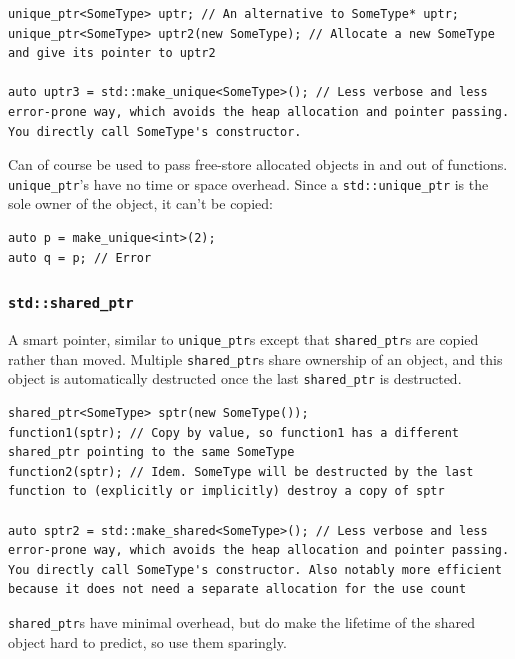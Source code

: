 \documentclass[table, xcdraw]{article}%
\begin{document}
\begin{verbatim}
unique_ptr<SomeType> uptr; // An alternative to SomeType* uptr;
unique_ptr<SomeType> uptr2(new SomeType); // Allocate a new SomeType and give its pointer to uptr2

auto uptr3 = std::make_unique<SomeType>(); // Less verbose and less error-prone way, which avoids the heap allocation and pointer passing. You directly call SomeType's constructor.
\end{verbatim}

Can of course be used to pass free-store allocated objects in and out of functions. \texttt{unique_ptr}'s have no time or space overhead. Since a \texttt{std::unique_ptr} is the sole owner of the object, it can't be copied:

\begin{verbatim}
auto p = make_unique<int>(2);
auto q = p; // Error
\end{verbatim}

\subsubsection{\texttt{std::shared_ptr}} \label{shared_ptr}

A smart pointer, similar to \texttt{unique_ptr}s except that \texttt{shared_ptr}s are copied rather than moved. Multiple \texttt{shared_ptr}s share ownership of an object, and this object is automatically destructed once the last \texttt{shared_ptr} is destructed.

\begin{verbatim}
shared_ptr<SomeType> sptr(new SomeType());
function1(sptr); // Copy by value, so function1 has a different shared_ptr pointing to the same SomeType
function2(sptr); // Idem. SomeType will be destructed by the last function to (explicitly or implicitly) destroy a copy of sptr

auto sptr2 = std::make_shared<SomeType>(); // Less verbose and less error-prone way, which avoids the heap allocation and pointer passing. You directly call SomeType's constructor. Also notably more efficient because it does not need a separate allocation for the use count
\end{verbatim}

\texttt{shared_ptr}s have minimal overhead, but do make the lifetime of the shared object hard to predict, so use them sparingly.
\end{document}
